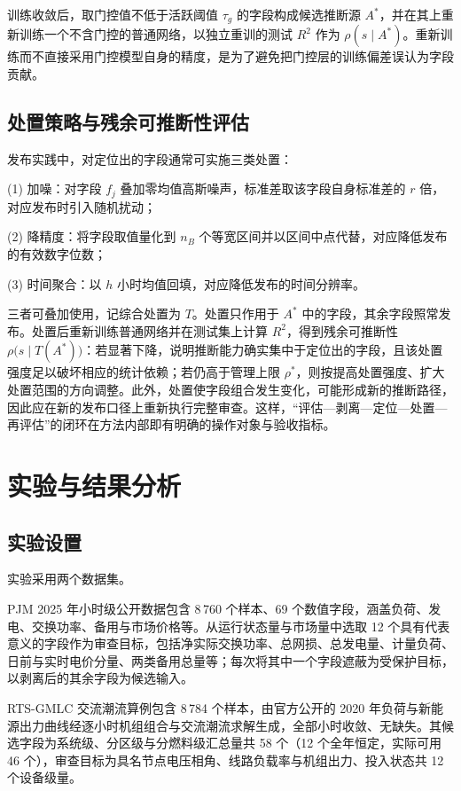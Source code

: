\documentclass[UTF8,zihao=5,twoside]{ctexart}
\begin{document}
训练收敛后，取门控值不低于活跃阈值 $\tau_g$ 的字段构成候选推断源 $A^{\ast}$，并在其上重新训练一个不含门控的普通网络，以独立重训的测试 $R^2$ 作为 $\rho(s\mid A^{\ast})$。重新训练而不直接采用门控模型自身的精度，是为了避免把门控层的训练偏差误认为字段贡献。

\subsection{处置策略与残余可推断性评估}

发布实践中，对定位出的字段通常可实施三类处置：

(1) 加噪：对字段 $f_j$ 叠加零均值高斯噪声，标准差取该字段自身标准差的 $r$ 倍，对应发布时引入随机扰动；

(2) 降精度：将字段取值量化到 $n_B$ 个等宽区间并以区间中点代替，对应降低发布的有效数字位数；

(3) 时间聚合：以 $h$ 小时均值回填，对应降低发布的时间分辨率。

三者可叠加使用，记综合处置为 $T$。处置只作用于 $A^{\ast}$ 中的字段，其余字段照常发布。处置后重新训练普通网络并在测试集上计算 $R^2$，得到残余可推断性 $\rho\big(s\mid T(A^{\ast})\big)$：若显著下降，说明推断能力确实集中于定位出的字段，且该处置强度足以破坏相应的统计依赖；若仍高于管理上限 $\rho^{\ast}$，则按提高处置强度、扩大处置范围的方向调整。此外，处置使字段组合发生变化，可能形成新的推断路径，因此应在新的发布口径上重新执行完整审查。这样，“评估—剥离—定位—处置—再评估”的闭环在方法内部即有明确的操作对象与验收指标。

\section{实验与结果分析}

\subsection{实验设置}

实验采用两个数据集。

PJM 2025 年小时级公开数据\cite{ref-pjm-dataminer}包含 8\,760 个样本、69 个数值字段，涵盖负荷、发电、交换功率、备用与市场价格等。从运行状态量与市场量中选取 12 个具有代表意义的字段作为审查目标，包括净实际交换功率、总网损、总发电量、计量负荷、日前与实时电价分量、两类备用总量等；每次将其中一个字段遮蔽为受保护目标，以剥离后的其余字段为候选输入。

RTS-GMLC 交流潮流算例\cite{ref-rtsgmlc}包含 8\,784 个样本，由官方公开的 2020 年负荷与新能源出力曲线经逐小时机组组合与交流潮流求解生成，全部小时收敛、无缺失。其候选字段为系统级、分区级与分燃料级汇总量共 58 个（12 个全年恒定，实际可用 46 个），审查目标为具名节点电压相角、线路负载率与机组出力、投入状态共 12 个设备级量。
\end{document}
